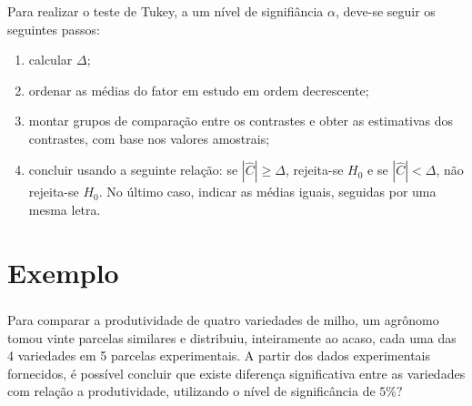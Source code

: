 \documentclass[14pt,aspectratio=1610]{beamer}
\begin{document}
\begin{frame}{}
\frametitle{}
\begin{block}{}
\justifying
Para realizar o teste de Tukey, a um nível de signifiância $\alpha$, 
deve-se seguir os seguintes passos:
\begin{enumerate}
  \item calcular $\Delta;$\pause
  \item ordenar as médias do fator em estudo em ordem decrescente;\pause
  \item montar grupos de comparação entre os contrastes e obter as 
  estimativas dos contrastes, com base nos valores amostrais; \pause
  \item concluir usando a seguinte relação: se $|\hat{C}| \geq \Delta$,
  rejeita-se $H_0$ e se $|\hat{C}| < \Delta$, não rejeita-se $H_0$. No 
  último caso, indicar as médias iguais, seguidas por uma mesma letra.
\end{enumerate}

\end{block}
\end{frame}

\section{Exemplo}
\begin{frame}{}
\frametitle{}
\begin{block}{}
\justifying
Para comparar a produtividade de quatro variedades de milho, um agrônomo tomou
vinte parcelas similares e distribuiu, inteiramente ao acaso, cada uma das 4 variedades em 5 parcelas experimentais. A partir dos dados experimentais fornecidos, é possível concluir que existe diferença significativa entre as variedades com relação a produtividade, utilizando o nível de significância de $5\%?$
\vspace{-0.5cm}
\begin{table}[!h]
\end{table}
\end{block}
\end{frame}
\end{document}
